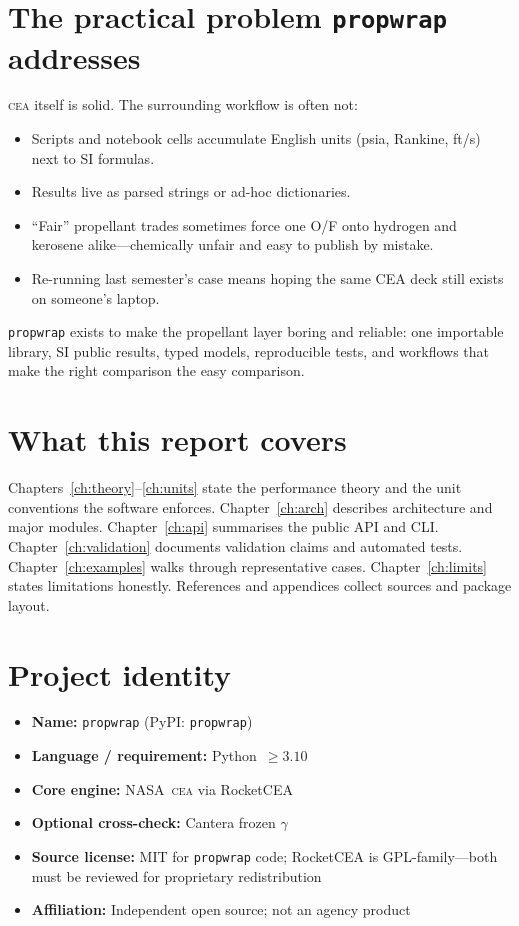 \documentclass[11pt,a4paper]{report}
\newcommand{\pw}{\texttt{propwrap}}
\newcommand{\cea}{\textsc{cea}}
\begin{document}
\section{The practical problem \pw{} addresses}

\cea{} itself is solid. The surrounding workflow is often not:

\begin{itemize}[leftmargin=*]
  \item Scripts and notebook cells accumulate English units (psia, Rankine,
        ft/s) next to SI formulas.
  \item Results live as parsed strings or ad-hoc dictionaries.
  \item ``Fair'' propellant trades sometimes force one O/F onto hydrogen and
        kerosene alike---chemically unfair and easy to publish by mistake.
  \item Re-running last semester's case means hoping the same CEA deck still
        exists on someone's laptop.
\end{itemize}

\pw{} exists to make the propellant layer boring and reliable: one importable
library, SI public results, typed models, reproducible tests, and workflows that
make the right comparison the easy comparison.

\section{What this report covers}

Chapters~\ref{ch:theory}--\ref{ch:units} state the performance theory and the
unit conventions the software enforces. Chapter~\ref{ch:arch} describes
architecture and major modules. Chapter~\ref{ch:api} summarises the public API
and CLI. Chapter~\ref{ch:validation} documents validation claims and automated
tests. Chapter~\ref{ch:examples} walks through representative cases.
Chapter~\ref{ch:limits} states limitations honestly. References and appendices
collect sources and package layout.

\section{Project identity}

\begin{itemize}[leftmargin=*]
  \item \textbf{Name:} \pw{} (PyPI: \texttt{propwrap})
  \item \textbf{Language / requirement:} Python~$\geq 3.10$
  \item \textbf{Core engine:} NASA~\cea{} via RocketCEA~\citep{rocketcea}
  \item \textbf{Optional cross-check:} Cantera frozen $\gamma$~\citep{cantera}
  \item \textbf{Source license:} MIT for \pw{} code; RocketCEA is GPL-family---both
        must be reviewed for proprietary redistribution
  \item \textbf{Affiliation:} Independent open source; not an agency product
\end{itemize}
\end{document}
